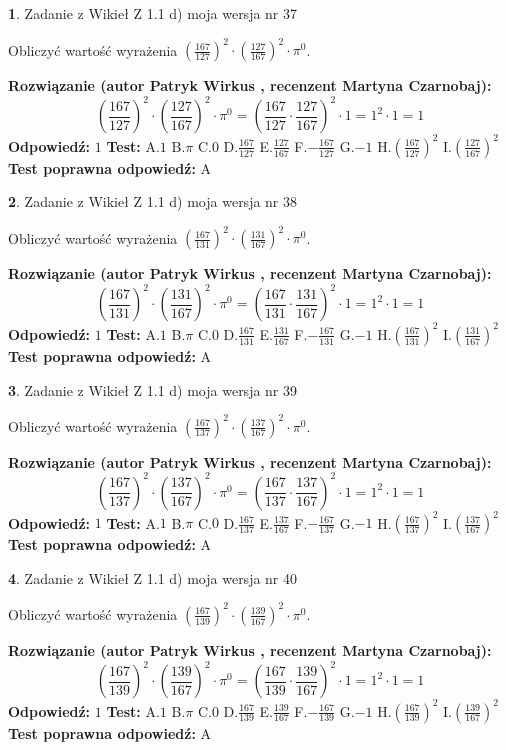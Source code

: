 \documentclass[12pt, a4paper]{article}
\theoremstyle{definition} %
\newtheorem{zad}{}
\newcommand{\zadStart}[1]{\begin{zad}#1\newline}
\newcommand{\zadStop}{\end{zad}}
\newcommand{\rozwStart}[2]{\noindent \textbf{Rozwiązanie (autor #1 , recenzent #2): }\newline}
\newcommand{\rozwStop}{\newline}
\newcommand{\odpStart}{\noindent \textbf{Odpowiedź:}\newline}
\newcommand{\odpStop}{\newline}
\newcommand{\testStart}{\noindent \textbf{Test:}\newline}
\newcommand{\testStop}{\newline}
\newcommand{\kluczStart}{\noindent \textbf{Test poprawna odpowiedź:}\newline}
\newcommand{\kluczStop}{\newline}
\begin{document}
\zadStart{Zadanie z Wikieł Z 1.1 d) moja wersja nr 37}

Obliczyć wartość wyrażenia $(\frac{167}{127})^{2} \cdot (\frac{127}{167})^{2} \cdot \pi^{0}$.
\zadStop
\rozwStart{Patryk Wirkus}{Martyna Czarnobaj}
$$(\frac{167}{127})^{2} \cdot (\frac{127}{167})^{2} \cdot \pi^{0} = (\frac{167}{127} \cdot \frac{127}{167})^{2} \cdot 1 = 1^{2} \cdot 1 = 1$$
\rozwStop
\odpStart
$1$
\odpStop
\testStart
A.$1$ B.$\pi$ C.$0$ D.$\frac{167}{127}$ E.$\frac{127}{167}$
F.$-\frac{167}{127}$ G.$-1$
H.$(\frac{167}{127})^{2}$
I.$(\frac{127}{167})^{2}$
\testStop
\kluczStart
A
\kluczStop



\zadStart{Zadanie z Wikieł Z 1.1 d) moja wersja nr 38}

Obliczyć wartość wyrażenia $(\frac{167}{131})^{2} \cdot (\frac{131}{167})^{2} \cdot \pi^{0}$.
\zadStop
\rozwStart{Patryk Wirkus}{Martyna Czarnobaj}
$$(\frac{167}{131})^{2} \cdot (\frac{131}{167})^{2} \cdot \pi^{0} = (\frac{167}{131} \cdot \frac{131}{167})^{2} \cdot 1 = 1^{2} \cdot 1 = 1$$
\rozwStop
\odpStart
$1$
\odpStop
\testStart
A.$1$ B.$\pi$ C.$0$ D.$\frac{167}{131}$ E.$\frac{131}{167}$
F.$-\frac{167}{131}$ G.$-1$
H.$(\frac{167}{131})^{2}$
I.$(\frac{131}{167})^{2}$
\testStop
\kluczStart
A
\kluczStop



\zadStart{Zadanie z Wikieł Z 1.1 d) moja wersja nr 39}

Obliczyć wartość wyrażenia $(\frac{167}{137})^{2} \cdot (\frac{137}{167})^{2} \cdot \pi^{0}$.
\zadStop
\rozwStart{Patryk Wirkus}{Martyna Czarnobaj}
$$(\frac{167}{137})^{2} \cdot (\frac{137}{167})^{2} \cdot \pi^{0} = (\frac{167}{137} \cdot \frac{137}{167})^{2} \cdot 1 = 1^{2} \cdot 1 = 1$$
\rozwStop
\odpStart
$1$
\odpStop
\testStart
A.$1$ B.$\pi$ C.$0$ D.$\frac{167}{137}$ E.$\frac{137}{167}$
F.$-\frac{167}{137}$ G.$-1$
H.$(\frac{167}{137})^{2}$
I.$(\frac{137}{167})^{2}$
\testStop
\kluczStart
A
\kluczStop



\zadStart{Zadanie z Wikieł Z 1.1 d) moja wersja nr 40}

Obliczyć wartość wyrażenia $(\frac{167}{139})^{2} \cdot (\frac{139}{167})^{2} \cdot \pi^{0}$.
\zadStop
\rozwStart{Patryk Wirkus}{Martyna Czarnobaj}
$$(\frac{167}{139})^{2} \cdot (\frac{139}{167})^{2} \cdot \pi^{0} = (\frac{167}{139} \cdot \frac{139}{167})^{2} \cdot 1 = 1^{2} \cdot 1 = 1$$
\rozwStop
\odpStart
$1$
\odpStop
\testStart
A.$1$ B.$\pi$ C.$0$ D.$\frac{167}{139}$ E.$\frac{139}{167}$
F.$-\frac{167}{139}$ G.$-1$
H.$(\frac{167}{139})^{2}$
I.$(\frac{139}{167})^{2}$
\testStop
\kluczStart
A
\kluczStop
\end{document}
